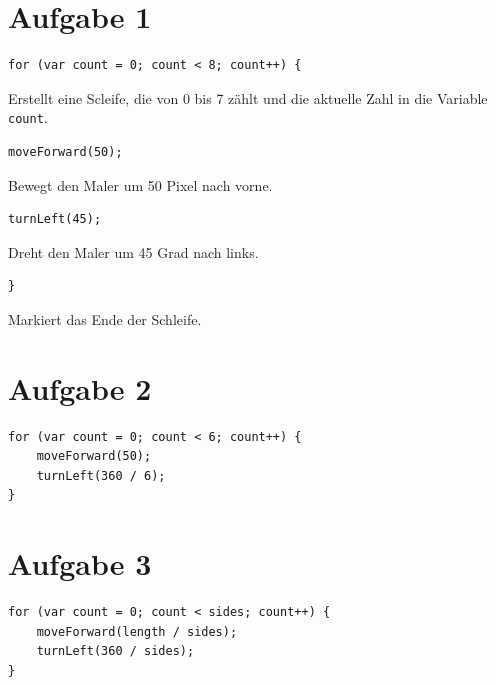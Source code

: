 \documentclass[8pt, letterpaper]{article}
\begin{document}
\section{Aufgabe 1}
\begin{verbatim}
for (var count = 0; count < 8; count++) {
\end{verbatim}
Erstellt eine Scleife, die von 0 bis 7 zählt und die aktuelle Zahl in die Variable \texttt{count}.

\begin{verbatim}
moveForward(50);
\end{verbatim}
Bewegt den Maler um 50 Pixel nach vorne.

\begin{verbatim}
turnLeft(45);
\end{verbatim}
Dreht den Maler um 45 Grad nach links.

\begin{verbatim}
}
\end{verbatim}
Markiert das Ende der Schleife.

\section{Aufgabe 2}
\begin{verbatim}
for (var count = 0; count < 6; count++) {
    moveForward(50);
    turnLeft(360 / 6);
}
\end{verbatim}

\section{Aufgabe 3}
\begin{verbatim}
for (var count = 0; count < sides; count++) {
    moveForward(length / sides);
    turnLeft(360 / sides);
}
\end{verbatim}
\end{document}
